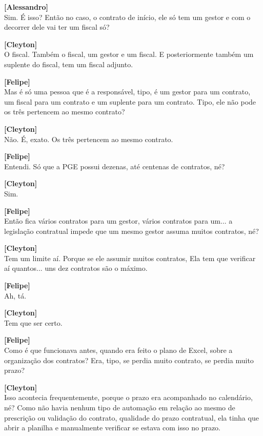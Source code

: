 \documentclass[12pt,a4paper]{article}
\begin{document}
\begin{entrevista}
    \textbf{[Alessandro]} \\
    Sim. É isso? Então no caso, o contrato de início, ele só tem um gestor e com o decorrer dele vai ter um fiscal só?

    \textbf{[Cleyton]} \\
    O fiscal. Também o fiscal, um gestor e um fiscal. E posteriormente também um suplente do fiscal, tem um fiscal adjunto.

    \textbf{[Felipe]} \\
    Mas é só uma pessoa que é a responsável, tipo, é um gestor para um contrato, um fiscal para um contrato e um suplente para um contrato. Tipo, ele não pode os três pertencem ao mesmo contrato?

    \textbf{[Cleyton]} \\
    Não. É, exato. Os três pertencem ao mesmo contrato.

    \textbf{[Felipe]} \\
    Entendi. Só que a PGE possui dezenas, até centenas de contratos, né?

    \textbf{[Cleyton]} \\
    Sim.

    \textbf{[Felipe]} \\
    Então fica vários contratos para um gestor, vários contratos para um... a legislação contratual impede que um mesmo gestor assuma muitos contratos, né?

    \textbf{[Cleyton]} \\
    Tem um limite aí. Porque se ele assumir muitos contratos, Ela tem que verificar aí quantos... uns dez contratos são o máximo.

    \textbf{[Felipe]} \\
    Ah, tá.

    \textbf{[Cleyton]} \\
    Tem que ser certo.

    \textbf{[Felipe]} \\
    Como é que funcionava antes, quando era feito o plano de Excel, sobre a organização dos contratos? Era, tipo, se perdia muito contrato, se perdia muito prazo?

    \textbf{[Cleyton]} \\
    Isso acontecia frequentemente, porque o prazo era acompanhado no calendário, né? Como não havia nenhum tipo de automação em relação ao mesmo de prescrição ou validação do contrato, qualidade do prazo contratual, ela tinha que abrir a planilha e manualmente verificar se estava com isso no prazo.


\end{entrevista}
\end{document}
